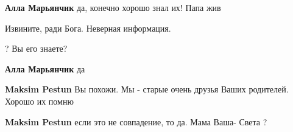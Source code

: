 \begin{itemize}
\begin{itemize}
\begin{itemize}
 
\textbf{Алла Марьянчик} да, конечно хорошо знал их! Папа жив


 
Извините, ради Бога. Неверная информация.
\end{itemize}

 
? Вы его знаете?


 
\textbf{Алла Марьянчик} да

\begin{itemize}
 
\textbf{Maksim Pestun} Вы похожи. Мы - старые очень друзья Ваших родителей. Хорошо их помню


 
\textbf{Maksim Pestun} если это не совпадение, то да. Мама Ваша- Света ?


 

\end{itemize}
\end{itemize}
\end{itemize}
